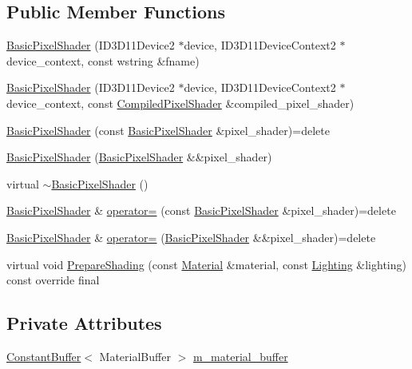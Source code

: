 \subsection*{Public Member Functions}
\begin{DoxyCompactItemize}
\item 
\hyperlink{classmage_1_1_basic_pixel_shader_ac1864f219b2c0dff76fd12f4607dc634}{Basic\+Pixel\+Shader} (I\+D3\+D11\+Device2 $\ast$device, I\+D3\+D11\+Device\+Context2 $\ast$device\+\_\+context, const wstring \&fname)
\item 
\hyperlink{classmage_1_1_basic_pixel_shader_a78887590e4ed3b769b68051ad9aa0db5}{Basic\+Pixel\+Shader} (I\+D3\+D11\+Device2 $\ast$device, I\+D3\+D11\+Device\+Context2 $\ast$device\+\_\+context, const \hyperlink{structmage_1_1_compiled_pixel_shader}{Compiled\+Pixel\+Shader} \&compiled\+\_\+pixel\+\_\+shader)
\item 
\hyperlink{classmage_1_1_basic_pixel_shader_ab82055206ff2a05b73f18ce23353a4bb}{Basic\+Pixel\+Shader} (const \hyperlink{classmage_1_1_basic_pixel_shader}{Basic\+Pixel\+Shader} \&pixel\+\_\+shader)=delete
\item 
\hyperlink{classmage_1_1_basic_pixel_shader_a0a5366edb694e78e4c8075fad70b7dff}{Basic\+Pixel\+Shader} (\hyperlink{classmage_1_1_basic_pixel_shader}{Basic\+Pixel\+Shader} \&\&pixel\+\_\+shader)
\item 
virtual \hyperlink{classmage_1_1_basic_pixel_shader_a7b4ac308850eb9ad55cbbd1e6389271b}{$\sim$\+Basic\+Pixel\+Shader} ()
\item 
\hyperlink{classmage_1_1_basic_pixel_shader}{Basic\+Pixel\+Shader} \& \hyperlink{classmage_1_1_basic_pixel_shader_a9656fdae2d17691d3e7dd850e7844efb}{operator=} (const \hyperlink{classmage_1_1_basic_pixel_shader}{Basic\+Pixel\+Shader} \&pixel\+\_\+shader)=delete
\item 
\hyperlink{classmage_1_1_basic_pixel_shader}{Basic\+Pixel\+Shader} \& \hyperlink{classmage_1_1_basic_pixel_shader_a5d6224f0454d1d1f9583f6b9f8ad8201}{operator=} (\hyperlink{classmage_1_1_basic_pixel_shader}{Basic\+Pixel\+Shader} \&\&pixel\+\_\+shader)=delete
\item 
virtual void \hyperlink{classmage_1_1_basic_pixel_shader_a67ce881c6c02b2ceabca29cd3b6a4a89}{Prepare\+Shading} (const \hyperlink{structmage_1_1_material}{Material} \&material, const \hyperlink{structmage_1_1_lighting}{Lighting} \&lighting) const override final
\end{DoxyCompactItemize}
\subsection*{Private Attributes}
\begin{DoxyCompactItemize}
\item 
\hyperlink{structmage_1_1_constant_buffer}{Constant\+Buffer}$<$ Material\+Buffer $>$ \hyperlink{classmage_1_1_basic_pixel_shader_aa61f52d3524276e234dbd2a1f3f13d6d}{m\+\_\+material\+\_\+buffer}
\end{DoxyCompactItemize}
